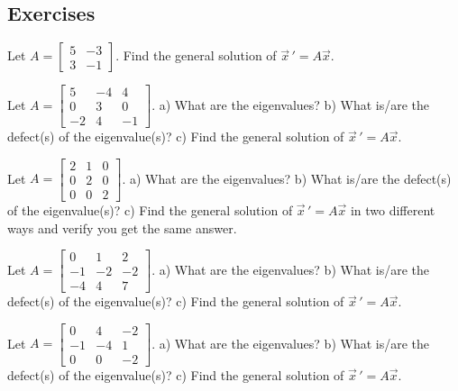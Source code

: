 \documentclass[12pt]{book}
\begin{document}
\subsection{Exercises}

\begin{exercise}
Let
$A = \left[ \begin{smallmatrix} 5 & -3 \\ 3 & -1 \end{smallmatrix} \right]$.
Find the general solution of ${\vec{x}\,}' = A \vec{x}$.
\end{exercise}

\begin{exercise}
Let
$A = \left[ \begin{smallmatrix}
5 & -4 & 4 \\
0 & 3 & 0 \\
-2 & 4 & -1
\end{smallmatrix} \right]$.
a) What are the eigenvalues?
b) What is/are the defect(s) of the eigenvalue(s)?
c) Find the general solution of ${\vec{x}\,}' = A \vec{x}$.
\end{exercise}


\begin{exercise}
Let
$A = \left[ \begin{smallmatrix} 2 & 1 & 0 \\ 0 & 2 & 0 \\ 0 & 0 & 2 \end{smallmatrix} \right]$.
a) What are the eigenvalues?
b) What is/are the defect(s) of the eigenvalue(s)?
c) Find the general solution of ${\vec{x}\,}' = A \vec{x}$ in two different ways and verify you get
the same answer.
\end{exercise}

\begin{exercise}
Let
$A = \left[ \begin{smallmatrix}
0 & 1 & 2 \\
-1 & -2 & -2 \\
-4 & 4 & 7
\end{smallmatrix} \right]$.
a) What are the eigenvalues?
b) What is/are the defect(s) of the eigenvalue(s)?
c) Find the general solution of ${\vec{x}\,}' = A \vec{x}$.
\end{exercise}

\begin{exercise}
Let
$A = \left[ \begin{smallmatrix}
0 & 4 & -2 \\
-1 & -4 & 1 \\
0 & 0 & -2
\end{smallmatrix} \right]$.
a) What are the eigenvalues?
b) What is/are the defect(s) of the eigenvalue(s)?
c) Find the general solution of ${\vec{x}\,}' = A \vec{x}$.
\end{exercise}
\end{document}
